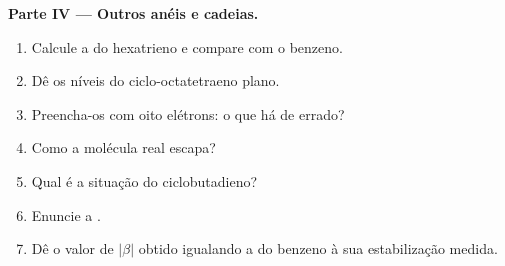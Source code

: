 \begin{problem}
\medskip
\noindent\textbf{Parte IV --- Outros anéis e cadeias.}
\begin{enumerate}[resume]
  \item Calcule a  do hexatrieno e compare com o benzeno.
  \item Dê os níveis do ciclo-octatetraeno plano.
  \item Preencha-os com oito elétrons: o que há de errado?
  \item Como a molécula real escapa?
  \item Qual é a situação do ciclobutadieno?
  \item Enuncie a .
  \item Dê o valor de $|\beta|$ obtido igualando a  do
        benzeno à sua estabilização medida.
\end{enumerate}
\end{problem}
